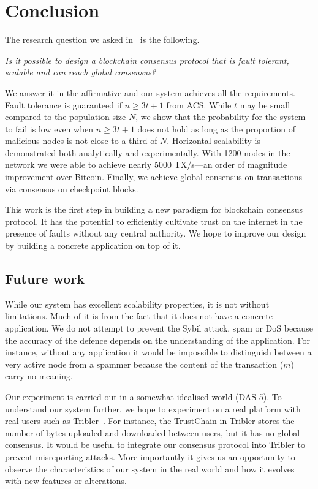 \chapter{Conclusion}
\label{ch:conclusion}

The research question we asked in~ is the following.
\begin{displayquote}
\emph{Is it possible to design a blockchain consensus protocol that is fault tolerant, scalable and can reach global consensus?}
\end{displayquote}
We answer it in the affirmative and our system achieves all the requirements.
Fault tolerance is guaranteed if $n \ge 3t + 1$ from ACS.
While $t$ may be small compared to the population size $N$,
we show that the probability for the system to fail is low even when $n \ge 3t + 1$ does not hold as long as the proportion of malicious nodes is not close to a third of $N$.
Horizontal scalability is demonstrated both analytically and experimentally.
With 1200 nodes in the network we were able to achieve nearly 5000 TX/s---an order of magnitude improvement over Bitcoin.
Finally, we achieve global consensus on transactions via consensus on checkpoint blocks.

This work is the first step in building a new paradigm for blockchain consensus protocol.
It has the potential to efficiently cultivate trust on the internet in the presence of faults without any central authority.
We hope to improve our design by building a concrete application on top of it.

\section{Future work}
While our system has excellent scalability properties, it is not without limitations.
Much of it is from the fact that it does not have a concrete application.
We do not attempt to prevent the Sybil attack, spam or DoS because the accuracy of the defence depends on the understanding of the application.
For instance, without any application it would be impossible to distinguish between a very active node from a spammer because the content of the transaction ($m$) carry no meaning.

Our experiment is carried out in a somewhat idealised world (DAS-5).
To understand our system further, we hope to experiment on a real platform with real users such as Tribler~\cite{pouwelse2008tribler}.
For instance, the TrustChain in Tribler stores the number of bytes uploaded and downloaded between users, but it has no global consensus.
It would be useful to integrate our consensus protocol into Tribler to prevent misreporting attacks.
More importantly it gives us an opportunity to observe the characteristics of our system in the real world and how it evolves with new features or alterations.

